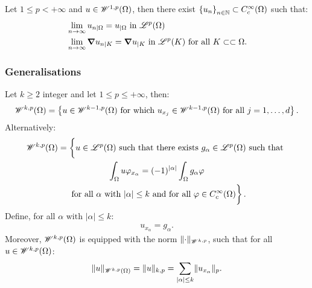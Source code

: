 \begin{theorem}
    Let $1 \leq p < +\infty$ and $u \in \mathscr{W}^{1, p}(\Omega)$, then there exist $\left\{ u_n \right\}_{n \in \mathbb{N}} \subset C_c^{\infty}(\Omega)$ such that:
    \begin{align}
        & \lim_{n \rightarrow \infty} u_{n \mid \Omega} = u_{\mid \Omega} \text { in } \mathscr{L}^{p}(\Omega)\\
        & \lim_{n \rightarrow \infty} \bm{\nabla} u_{n \mid K} = \bm{\nabla} u_{\mid K} \text { in } \mathscr{L}^{p}(K) \text{ for all } K \subset \subset \Omega.
    \end{align}
\end{theorem}

\subsubsection{Generalisations}

\begin{definition}
    Let $k \geq 2$ integer and let $1 \leq p \leq +\infty$, then:
    \begin{gather}
        \mathscr{W}^{k, p}(\Omega) = \left\{ u \in \mathscr{W}^{k - 1, p}(\Omega) \text{ for which } u_{x_j} \in \mathscr{W}^{k - 1, p}(\Omega) \text{ for all } j = 1, \dots, d \right\}.
    \end{gather}
    Alternatively:
    \begin{gather}
        \SpaceWkp{k}{p}(\Omega) = \left\{ \vphantom{\int_{\Omega}} u \in \SpaceLp{p}(\Omega) \text{ such that there exists } g_{\alpha} \in \SpaceLp{p}(\Omega) \text{ such that } \right. \notag \\ 
        \left. \int_{\Omega} u \varphi_{x_{\alpha}} = (-1)^{\lvert \alpha \rvert} \int_{\Omega} g_{\alpha} \varphi \right. \notag \\
        \left. \text{ for all } \alpha \text{ with } \lvert \alpha \rvert \leq k \text{ and for all }\varphi \in C_c^{\infty}(\Omega) \vphantom{\int_{\Omega}} \right\}.
    \end{gather}
    Define, for all $\alpha \text{ with } \lvert \alpha \rvert \leq k$:
    \begin{gather}
        u_{x_{\alpha}} = g_{\alpha}.
    \end{gather}
    Moreover, $\mathscr{W}^{k, p}(\Omega)$ is equipped with the norm $\lVert \cdot \rVert_{\mathscr{W}^{k, p}}$, such that for all $u \in \mathscr{W}^{k, p}(\Omega)$:
    \begin{gather}
        \lVert u \rVert_{\mathscr{W}^{k, p}(\Omega)} = \lVert u \rVert_{k, p} = \sum_{\lvert \alpha \rvert \leq k} \lVert u_{x_{\alpha}} \rVert_p.
    \end{gather}
\end{definition}

